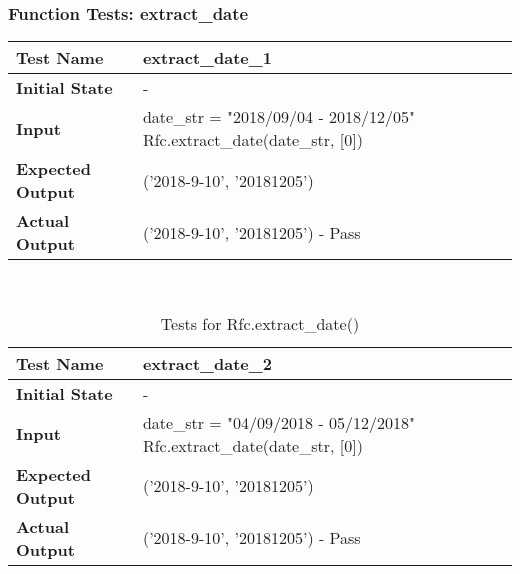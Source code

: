\documentclass[12pt, titlepage]{article}
\begin{document}
	    \subsubsection{Function Tests: extract\_date}
	    \begin{table}[!htbp]
			\begin{tabularx}{\textwidth}{|l|X|}%
				\hline
                \textbf{Test Name} & extract\_date\_1  
                \\\hline
                \textbf{Initial State} & -
                \\\hline
                \textbf{Input} & date\_str = "2018/09/04 - 2018/12/05" \newline Rfc.extract\_date(date\_str, [0])
                \\\hline 
                \textbf{Expected Output} & ('2018-9-10', '20181205')
                \\\hline
                \textbf{Actual Output} & ('2018-9-10', '20181205') - Pass
                \\\hline
			\end{tabularx}\\ %
	    \end{table}			
            \hfill	%
	    \begin{table}[!htbp]
			\begin{tabularx}{\textwidth}{|l|X|}%
				\hline
                \textbf{Test Name} & extract\_date\_2  
                \\\hline
                \textbf{Initial State} & -
                \\\hline
                \textbf{Input} & date\_str = "04/09/2018 - 05/12/2018" \newline Rfc.extract\_date(date\_str, [0])
                \\\hline 
                \textbf{Expected Output} & ('2018-9-10', '20181205')
                \\\hline
                \textbf{Actual Output} & ('2018-9-10', '20181205') - Pass
                \\\hline
			\end{tabularx}\\ %
			\caption{Tests for Rfc.extract\_date()}
			\label{Table}
        \end{table}

\FloatBarrier       %
\end{document}

